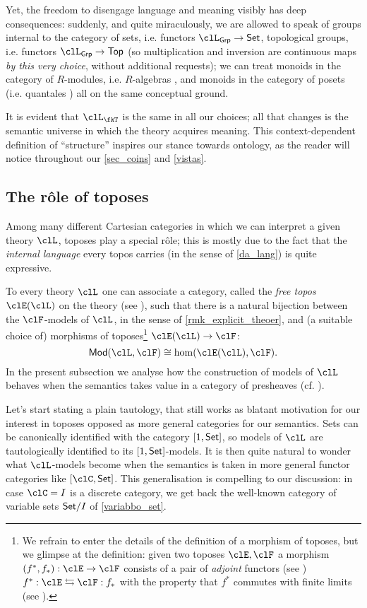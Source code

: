 Yet, the freedom to disengage language and meaning visibly has deep consequences: suddenly, and quite miraculously, we are allowed to speak of groups internal to the category of sets, i.e. functors $\clL_{\cate{Grp}} \to \Set$, topological groups, i.e. functors $\clL_{\cate{Grp}} \to \cate{Top}$ (so multiplication and inversion are continuous maps \emph{by this very choice}, without additional requests); we can treat monoids in the category of $R$-modules, i.e. $R$-algebras \cite[IV]{book337527}, and monoids in the category of posets (i.e. quantales \cite{Paseka2000}) all on the same conceptual ground.

It is evident that $\clL_{\fkT}$ is the same in all our choices; all that changes is the semantic universe in which the theory acquires meaning. This context-dependent definition of ``structure'' inspires our stance towards ontology, as the reader will notice throughout our \autoref{sec_coins} and \autoref{vistas}.

\subsection{The r\^ole of toposes}
Among many different Cartesian categories in which we can interpret a given theory $\clL$, toposes play a special r\^ole; this is mostly due to the fact that the \emph{internal language} every topos carries (in the sense of \autoref{da_lang}) is quite expressive.

To every theory $\clL$ one can associate a category, called the \emph{free topos} $\clE(\clL)$ on the theory (see \cite{lambek1988introduction}), such that there is a natural bijection between the $\clF$-models of $\clL$, in the sense of  \autoref{rmk_explicit_theoer}, and (a suitable choice of) morphisms of toposes\footnote{We refrain to enter the details of the definition of a morphism of toposes, but we glimpse at the definition: given two toposes $\clE,\clF$ a morphism $(f^*,f_*): \clE \to \clF$ consists of a pair of \emph{adjoint} functors (see \cite[3]{Bor1}) $f^*: \clE \leftrightarrows \clF: f_*$ with the property that $f^*$ commutes with finite limits (see \cite[2.8.2]{Bor1}).} $\clE(\clL) \to \clF$:
\[\cate{Mod}(\clL, \clF) \cong \hom(\clE(\clL), \clF).\]
In the present subsection we analyse how the construction of models of $\clL$ behaves when the semantics takes value in a category of presheaves (cf. \cite[??]{Bor1}).

Let's start stating a plain tautology, that still works as blatant motivation for our interest in toposes opposed as more general categories for our semantics. Sets can be canonically identified with the category $[1,\mathsf{Set}]$, so models of $\clL$ are tautologically identified to its $[1,\mathsf{Set}]$-models. It is then quite natural to wonder what $\clL$-models become when the semantics is taken in more general functor categories like $[\clC,\Set]$. This generalisation is compelling to our discussion: in case $\clC=I$ is a discrete category, we get back the well-known category of variable sets $\mathsf{Set}/I$ of \autoref{variabbo_set}.

